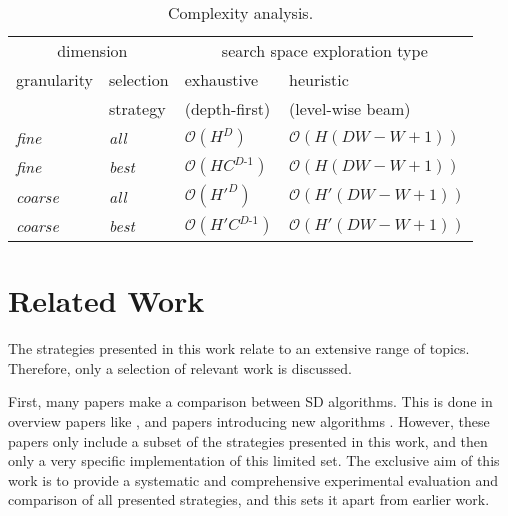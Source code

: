 \documentclass[smallextended]{svjour3}
\newcommand{\hs}{H}
\newcommand{\bw}{W} %
\newcommand{\bb}{C} %
\newcommand{\dm}{D} %
\newcommand{\parameter}{\emph}
\newcommand{\fine}{\parameter{fine}}
\newcommand{\coarse}{\parameter{coarse}}
\newcommand{\all}{\parameter{all}}
\newcommand{\best}{\parameter{best}}
\newcommand{\sd}{SD}
\begin{document}
\begin{table}[!h]
\centering
\caption{Complexity analysis.}
\label{table:complexity-analysis}
\begin{tabular}{ll|ll}
\multicolumn{2}{c|}{dimension} & \multicolumn{2}{c}{search space exploration type}\\
granularity & selection   & exhaustive                                                 & heuristic\\
            & strategy    & (depth-first)                                              & (level-wise beam)\\
\hline
\fine{}     & \all{}      & $\mathcal{O} \left( \hs{}^\dm{} \right)$                   & $\mathcal{O} \left( \hs{} (\dm{}\bw{}{-}\bw{}{+}1) \right)$\\
\fine{}     & \best{}     & $\mathcal{O} \left( \hs{} \bb{}^{\dm{}\text{-}1} \right)$  & $\mathcal{O} \left( \hs{} (\dm{}\bw{}{-}\bw{}{+}1) \right)$\\
\coarse{}   & \all{}      & $\mathcal{O} \left( \hs{}'^\dm{} \right)$                  & $\mathcal{O} \left( \hs{}' (\dm{}\bw{}{-}\bw{}{+}1) \right)$\\
\coarse{}   & \best{}     & $\mathcal{O} \left( \hs{}' \bb{}^{\dm{}\text{-}1} \right)$ & $\mathcal{O} \left( \hs{}' (\dm{}\bw{}{-}\bw{}{+}1) \right)$\\
\end{tabular}
\end{table}



\section{Related Work}
\label{section:related-work}

The strategies presented in this work relate to an extensive range of topics.
Therefore, only a selection of relevant work is discussed.

First, many papers make a comparison between \sd{} algorithms.
This is done in overview papers like \cite{atzmueller:2015,herrera:2011}, and papers introducing new algorithms \cite{atzmueller:2006,atzmueller:2009:ismis,boley:2017,grosskreutz:2009,leeuwen:2012,mampaey:2012,mampaey:2015,meeng:2014,nguyen:2014}.
However, these papers only include a subset of the strategies presented in this work, and then only a very specific implementation of this limited set.
The exclusive aim of this work is to provide a systematic and comprehensive experimental evaluation and comparison of all presented strategies, and this sets it apart from earlier work. 
\end{document}
